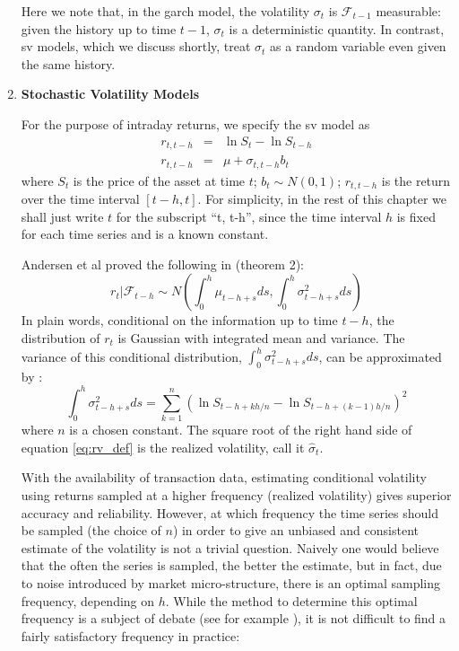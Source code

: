 \begin{enumerate}
Here we note that, in the \gls{garch} model, the volatility $\sigma_t$ is
$\mathcal{F}_{t-1}$ measurable: given the history up to time $t-1$,
$\sigma_t$ is a deterministic quantity. In contrast, \gls{sv} models,
which we discuss shortly, treat $\sigma_t$ as a random variable even
given the same history.

\item {\bf Stochastic Volatility Models}\label{sec:SLV_model}

For the purpose of intraday returns, we specify the \gls{sv} model as
\begin{eqnarray}
   r_{t, t-h} &=& \ln S_{t} - \ln S_{t-h} \nonumber \\
   r_{t, t-h} &=& \mu + \sigma_{t, t-h} b_t \label{eq:SLV_spec}
\end{eqnarray}
where $S_t$ is the price of the asset at time $t$; $b_t \sim N(0,
1)$; $r_{t, t-h}$ is the return over the time interval $[t-h, t]$.
For simplicity, in the rest of this chapter we shall just write
$t$ for the subscript ``t, t-h'', since the time interval $h$ is fixed
for each time series and is a known constant.

Andersen et al proved the following in \cite{Andersen03} (theorem 2):
\begin{equation}
  \label{eq:normal_r}
  r_t|\mathcal{F}_{t-h} \sim N(\int_{0}^h \mu_{t-h+s} ds, \int_{0}^h
  \sigma_{t-h+s}^2 ds)
\end{equation}
In plain words, conditional on the information up to time $t-h$, the
distribution of $r_t$ is Gaussian with integrated mean and variance.
The variance of this conditional distribution, $\int_{0}^h
\sigma_{t-h+s}^2 ds$, can be approximated by \cite{Protter05,
  Andersen03}:
\begin{equation}
  \label{eq:rv_def}
  \int_{0}^h \sigma_{t-h+s}^2 ds = \sum_{k=1}^n \left(
    \ln S_{t-h+kh/n} - \ln S_{t-h+(k-1)h/n} \right)^2
\end{equation}
where $n$ is a chosen constant. The square root of the right hand side
of equation \ref{eq:rv_def} is the realized volatility, call it
$\hat{\sigma}_t$.

With the availability of transaction data, estimating conditional
volatility using returns sampled at a higher frequency (realized
volatility) gives superior accuracy and reliability. However, at which
frequency the time series should be sampled (the choice of $n$) in
order to give an unbiased and consistent estimate of the volatility is
not a trivial question. Naively one would believe that the often the
series is sampled, the better the estimate, but in fact, due to noise
introduced by market micro-structure, there is an optimal sampling
frequency, depending on $h$. While the method to determine this
optimal frequency is a subject of debate (see for example
\cite{Sahalia05}), it is not difficult to find a fairly satisfactory
frequency in practice:


\end{enumerate}
